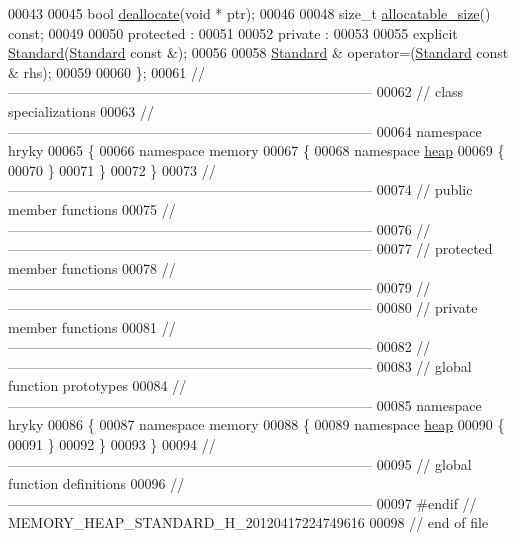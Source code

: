 \begin{DoxyCode}
00043 
00045     \textcolor{keywordtype}{bool} \hyperlink{classhryky_1_1memory_1_1heap_1_1_standard_adff68312e5eabe5c096386a45348f968}{deallocate}(\textcolor{keywordtype}{void} * ptr);
00046 
00048     \textcolor{keywordtype}{size\_t} \hyperlink{classhryky_1_1memory_1_1heap_1_1_standard_a55f1b34ebacf9ceec6b8b1e47d8897b1}{allocatable_size}() \textcolor{keyword}{const};
00049 
00050 \textcolor{keyword}{protected} :
00051 
00052 \textcolor{keyword}{private} :
00053 
00055     \textcolor{keyword}{explicit} \hyperlink{classhryky_1_1memory_1_1heap_1_1_standard_adcfec991c70fc90a1d022b79b87fedaf}{Standard}(\hyperlink{classhryky_1_1memory_1_1heap_1_1_standard}{Standard} \textcolor{keyword}{const} &);
00056 
00058     \hyperlink{classhryky_1_1memory_1_1heap_1_1_standard}{Standard} & operator=(\hyperlink{classhryky_1_1memory_1_1heap_1_1_standard}{Standard} \textcolor{keyword}{const} & rhs);
00059 
00060 \};
00061 \textcolor{comment}{//
      ------------------------------------------------------------------------------}
00062 \textcolor{comment}{// class specializations}
00063 \textcolor{comment}{//
      ------------------------------------------------------------------------------}
00064 \textcolor{keyword}{namespace }hryky
00065 \{
00066 \textcolor{keyword}{namespace }memory
00067 \{
00068 \textcolor{keyword}{namespace }\hyperlink{namespacehryky_1_1memory_1_1global_a6fc6103f67c837aa0f39b359588409cd}{heap}
00069 \{
00070 \}
00071 \}
00072 \}
00073 \textcolor{comment}{//
      ------------------------------------------------------------------------------}
00074 \textcolor{comment}{// public member functions}
00075 \textcolor{comment}{//
      ------------------------------------------------------------------------------}
00076 \textcolor{comment}{//
      ------------------------------------------------------------------------------}
00077 \textcolor{comment}{// protected member functions}
00078 \textcolor{comment}{//
      ------------------------------------------------------------------------------}
00079 \textcolor{comment}{//
      ------------------------------------------------------------------------------}
00080 \textcolor{comment}{// private member functions}
00081 \textcolor{comment}{//
      ------------------------------------------------------------------------------}
00082 \textcolor{comment}{//
      ------------------------------------------------------------------------------}
00083 \textcolor{comment}{// global function prototypes}
00084 \textcolor{comment}{//
      ------------------------------------------------------------------------------}
00085 \textcolor{keyword}{namespace }hryky
00086 \{
00087 \textcolor{keyword}{namespace }memory
00088 \{
00089 \textcolor{keyword}{namespace }\hyperlink{namespacehryky_1_1memory_1_1global_a6fc6103f67c837aa0f39b359588409cd}{heap}
00090 \{
00091 \}
00092 \}
00093 \}
00094 \textcolor{comment}{//
      ------------------------------------------------------------------------------}
00095 \textcolor{comment}{// global function definitions}
00096 \textcolor{comment}{//
      ------------------------------------------------------------------------------}
00097 \textcolor{preprocessor}{#endif // MEMORY\_HEAP\_STANDARD\_H\_20120417224749616}
00098 \textcolor{preprocessor}{}\textcolor{comment}{// end of file}
\end{DoxyCode}
